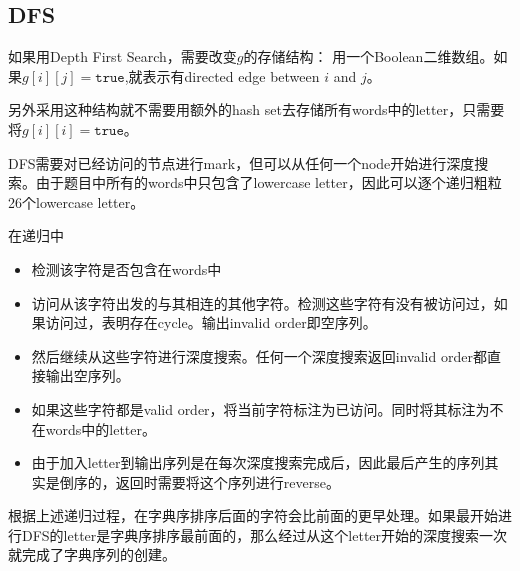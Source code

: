 \subsection{DFS}
如果用Depth First Search，需要改变$g$的存储结构： 用一个Boolean二维数组。如果$g[i][j]=\texttt{true}$,就表示有directed edge between $i$ and $j$。
\par
另外采用这种结构就不需要用额外的hash set去存储所有words中的letter，只需要将$g[i][i]=\texttt{true}$。
\par
DFS需要对已经访问的节点进行mark，但可以从任何一个node开始进行深度搜索。由于题目中所有的words中只包含了lowercase letter，因此可以逐个递归粗粒26个lowercase letter。
\par
在递归中
\begin{itemize}
\item 检测该字符是否包含在words中
\item 访问从该字符出发的与其相连的其他字符。检测这些字符有没有被访问过，如果访问过，表明存在cycle。输出invalid order即空序列。
\item 然后继续从这些字符进行深度搜索。任何一个深度搜索返回invalid order都直接输出空序列。
\item 如果这些字符都是valid order，将当前字符标注为已访问。同时将其标注为不在words中的letter。
\item 由于加入letter到输出序列是在每次深度搜索完成后，因此最后产生的序列其实是倒序的，返回时需要将这个序列进行reverse。
\end{itemize}
根据上述递归过程，在字典序排序后面的字符会比前面的更早处理。如果最开始进行DFS的letter是字典序排序最前面的，那么经过从这个letter开始的深度搜索一次就完成了字典序列的创建。
\setcounter{lstlisting}{0}
